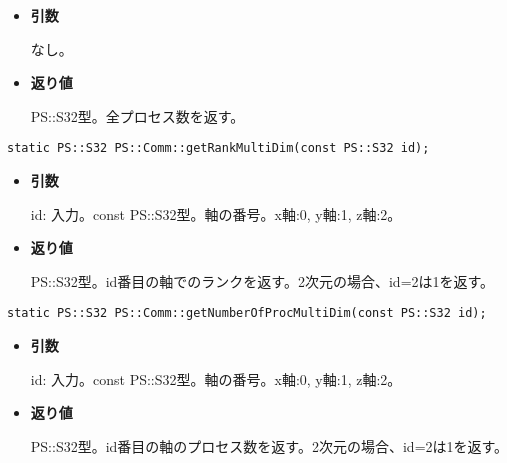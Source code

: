 \begin{itemize}

\item{{\bf 引数}}

なし。

\item{{\bf 返り値}}

PS::S32型。全プロセス数を返す。

\end{itemize}


\begin{screen}
\begin{verbatim}
static PS::S32 PS::Comm::getRankMultiDim(const PS::S32 id);
\end{verbatim}
\end{screen}

\begin{itemize}

\item{{\bf 引数}}

id: 入力。const PS::S32型。軸の番号。x軸:0, y軸:1, z軸:2。

\item{{\bf 返り値}}

PS::S32型。id番目の軸でのランクを返す。2次元の場合、id=2は1を返す。

\end{itemize}


\begin{screen}
\begin{verbatim}
static PS::S32 PS::Comm::getNumberOfProcMultiDim(const PS::S32 id);
\end{verbatim}
\end{screen}

\begin{itemize}

\item{{\bf 引数}}

id: 入力。const PS::S32型。軸の番号。x軸:0, y軸:1, z軸:2。

\item{{\bf 返り値}}

PS::S32型。id番目の軸のプロセス数を返す。2次元の場合、id=2は1を返す。

\end{itemize}


